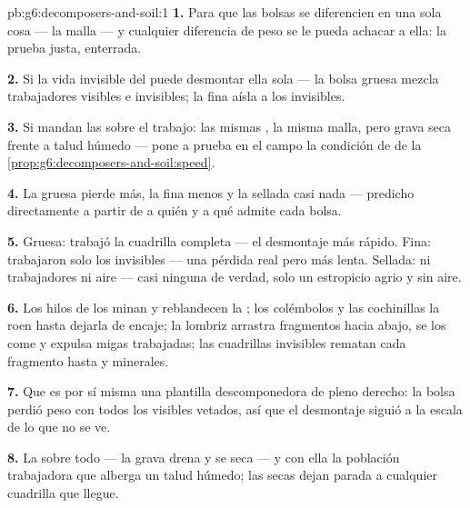 \begin{solution}{pb:g6:decomposers-and-soil:1}
\textbf{1.} Para que las bolsas se diferencien en una sola cosa --- la
malla --- y cualquier diferencia de peso se le pueda achacar a ella: la
prueba justa, enterrada.

\textbf{2.} Si la vida invisible del  puede desmontar  ella
sola --- la bolsa gruesa mezcla trabajadores visibles e invisibles; la
fina aísla a los invisibles.

\textbf{3.} Si mandan las  sobre el trabajo: las mismas
, la misma malla, pero grava seca frente a talud húmedo --- pone a
prueba en el campo la condición de  de la
\cref{prop:g6:decomposers-and-soil:speed}.

\textbf{4.} La gruesa pierde más, la fina menos y la sellada casi nada
--- predicho directamente a partir de a quién y a qué admite cada bolsa.

\textbf{5.} Gruesa: trabajó la cuadrilla completa --- el desmontaje más
rápido. Fina: trabajaron solo los invisibles --- una pérdida real pero
más lenta. Sellada: ni trabajadores ni aire --- casi ninguna
 de verdad, solo un estropicio agrio y sin aire.

\textbf{6.} Los hilos de los  minan y reblandecen la ; los
colémbolos y las cochinillas la roen hasta dejarla de encaje; la
lombriz arrastra fragmentos hacia abajo, se los come y expulsa migas
trabajadas; las cuadrillas invisibles rematan cada fragmento hasta
 y minerales.

\textbf{7.} Que es por sí misma una plantilla descomponedora de pleno
derecho: la bolsa perdió peso con todos los  visibles vetados,
así que el desmontaje siguió a la escala de lo que no se ve.

\textbf{8.} La  sobre todo --- la grava drena y se seca --- y
con ella la población trabajadora que alberga un talud húmedo; las
 secas dejan parada a cualquier cuadrilla que llegue.


\end{solution}
